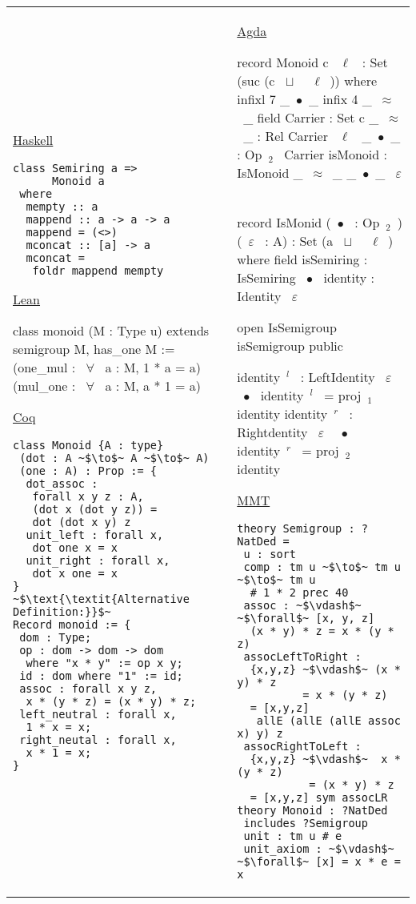 \footnotesize
\begin{tabular}{p{6.3cm} p{7cm}}
\underline{Haskell}
\begin{verbatim}
class Semiring a => 
      Monoid a 
 where 
  mempty :: a 
  mappend :: a -> a -> a 
  mappend = (<>) 
  mconcat :: [a] -> a 
  mconcat = 
   foldr mappend mempty 
\end{verbatim} 
\underline{Lean}
\begin{leancode}
class monoid (M : Type u)
 extends semigroup M, 
         has_one M :=
  (one_mul : ~$\forall$~ a : M, 
           1 * a = a) 
  (mul_one : ~$\forall$~ a : M, 
           a * 1 = a)   
\end{leancode} 
\underline{Coq}
\begin{verbatim}
class Monoid {A : type}
 (dot : A ~$\to$~ A ~$\to$~ A)
 (one : A) : Prop := {
  dot_assoc : 
   forall x y z : A, 
   (dot x (dot y z)) = 
   dot (dot x y) z
  unit_left : forall x, 
   dot one x = x 
  unit_right : forall x, 
   dot x one = x              
}
~$\text{\textit{Alternative Definition:}}$~
Record monoid := {
 dom : Type; 
 op : dom -> dom -> dom 
  where "x * y" := op x y; 
 id : dom where "1" := id; 
 assoc : forall x y z, 
  x * (y * z) = (x * y) * z; 
 left_neutral : forall x,   
  1 * x = x; 
 right_neutal : forall x,
  x * 1 = x; 
}
\end{verbatim} 
&
\underline{Agda}
\begin{agdacode}
record Monoid c ~$\ell$~ : 
   Set (suc (c ~$\sqcup$~ ~$\ell$~)) where 
 infixl 7 _~$\bullet$~_
 infix 4 _~$\approx$~_
 field 
  Carrier : Set c 
  _~$\approx$~_ : Rel Carrier ~$\ell$~ 
  _~$\bullet$~_ : Op~$_2$~ Carrier 
  isMonoid : IsMonoid _~$\approx$~_ _~$\bullet$~_ ~$\varepsilon$~ 
  
record IsMonid (~$\bullet$~ : Op~$_2$~) (~$\varepsilon$~ : A) 
 : Set (a ~$\sqcup$~ ~$\ell$~) where 
  field 
   isSemiring : IsSemiring ~$\bullet$~ 
   identity : Identity ~$\varepsilon$~ 
       
   open IsSemigroup isSemigroup public 
   
   identity~$^l$~ : LeftIdentity ~$\varepsilon$~ ~$\bullet$~ 
   identity~$^l$~ = proj~$_1$~ identity 
   identity~$^r$~ : Rightdentity ~$\varepsilon$~ ~$\bullet$~ 
   identity~$^r$~ = proj~$_2$~ identity        
\end{agdacode}       
\underline{MMT}
\begin{verbatim} 
theory Semigroup : ?NatDed = 
 u : sort 
 comp : tm u ~$\to$~ tm u ~$\to$~ tm u 
  # 1 * 2 prec 40
 assoc : ~$\vdash$~ ~$\forall$~ [x, y, z]
  (x * y) * z = x * (y * z)    
 assocLeftToRight : 
  {x,y,z} ~$\vdash$~ (x * y) * z 
          = x * (y * z) 
  = [x,y,z] 
   allE (allE (allE assoc x) y) z
 assocRightToLeft : 
  {x,y,z} ~$\vdash$~  x * (y * z) 
           = (x * y) * z 
  = [x,y,z] sym assocLR 
theory Monoid : ?NatDed 
 includes ?Semigroup 
 unit : tm u # e 
 unit_axiom : ~$\vdash$~ ~$\forall$~ [x] = x * e = x       
\end{verbatim}      
\end{tabular}  
